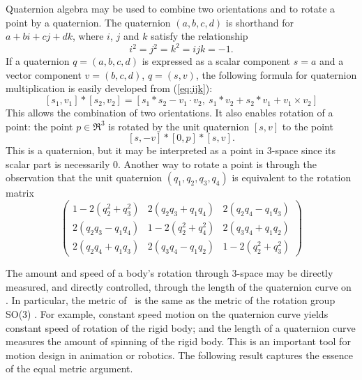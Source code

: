 \documentclass[12pt]{article}
\begin{document}
Quaternion algebra may be used to combine two orientations and to rotate a point
by a quaternion.
The quaternion $(a,b,c,d)$ is shorthand for $a + bi + cj + dk$,
where $i$, $j$ and $k$ satisfy the relationship 
\begin{equation}
\label{eq:ijk}
	i^2 = j^2 = k^2 = ijk = -1.   
\end{equation}
If a quaternion $q = (a,b,c,d)$ is expressed as a scalar component $s=a$
and a vector component $v = (b,c,d)$, $q = (s,v)$,
the following formula for quaternion multiplication is easily developed from (\ref{eq:ijk}):
\begin{equation}
\label{eq:qmult}
	[s_1,v_1] * [s_2,v_2] =
	[s_1*s_2 - v_1 \cdot v_2,\ 
	 s_1 * v_2 + s_2 * v_1 + v_1 \times v_2]
\end{equation}
This allows the combination of two orientations.
It also enables rotation of a point:
the point $p \in \Re^3$ is rotated by the unit quaternion $[s,v]$
to the point 
\[
[s,-v] * [0,p] * [s,v].
\]
This is a quaternion, but it may be interpreted as a point in 3-space 
since its scalar part is necessarily 0.
Another way to rotate a point is through the observation that 
the unit quaternion $(q_1,q_2,q_3,q_4)$ is equivalent to the rotation matrix
\cite{shoemake85}
\[
\left( 
\begin{array}{ccc}
1-2(q_2^2+q_3^2)   & 2(q_2q_3 + q_1q_4) & 2(q_2q_4 - q_1q_3) \\
2(q_2q_3 - q_1q_4) & 1-2(q_2^2+q_4^2)   & 2(q_3q_4 + q_1q_2) \\
2(q_2q_4 + q_1q_3) & 2(q_3q_4 - q_1q_2) & 1-2(q_2^2 + q_3^2)
\end{array}
\right)
\]

The amount and speed of a body's rotation through 3-space may be directly measured,
and directly controlled, through the length of the quaternion curve on .
In particular, the metric of \Sn{3}\ is the same as the
metric of the rotation group SO(3) \cite{misner73}.
For example, constant speed motion on the quaternion curve yields
constant speed of rotation of the rigid body;
and the length of a quaternion curve measures the amount of spinning of the rigid body.
This is an important tool for motion design in animation or robotics.
The following result captures the essence of the equal metric argument.
\end{document}
